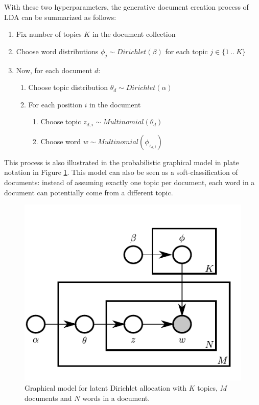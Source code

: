\documentclass[
        a4paper,
        titlepage,
        twoside,
        parskip
        ]{scrbook}
\theoremstyle{break}
\begin{document}
With these two hyperparameters, the generative document creation process of LDA can be summarized as follows:
\begin{enumerate}
       \item Fix number of topics $K$ in the document collection
       \item Choose word distributions $\phi_j \sim Dirichlet(\beta)$ for each topic $j \in \{1~..~K\}$
       \item Now, for each document $d$:
       \begin{enumerate}
              \item Choose topic distribution $\theta_d \sim Dirichlet(\alpha)$
              \item For each position $i$ in the document
              \begin{enumerate}
                     \item Choose topic $z_{d,i} \sim Multinomial(\theta_d)$
                     \item Choose word $w \sim Multinomial(\phi_{z_{d,i}})$
              \end{enumerate}
       \end{enumerate}
\end{enumerate}
This process is also illustrated in the probabilistic graphical model in plate notation in Figure \ref{fig:lda}.
This model can also be seen as a soft-classification of documents: instead of assuming exactly one topic per document, each word in a document can potentially come from a different topic.

\begin{figure}
       \centering
       \includegraphics{figures/lda.pdf}
       \caption{Graphical model for latent Dirichlet allocation with $K$ topics, $M$ documents and $N$ words in a document.}
       \label{fig:lda}
\end{figure}
\end{document}
